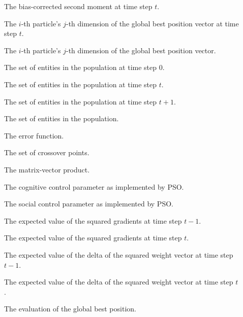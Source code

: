 \begin{description}
	\item [\parbox{2cm}{$\hat{\boldsymbol{v}}_{t}$}] \parbox{12.5cm}{The bias-corrected second moment at time step $t$.}
	\item [\parbox{2cm}{$\hat{y}_{ij}(t)$}] \parbox{12.5cm}{The $i$-th particle's $j$-th dimension of the global best position vector at time step $t$.}
	\item [\parbox{2cm}{$\hat{y}_{ij}$}] \parbox{12.5cm}{The $i$-th particle's $j$-th dimension of the global best position vector.}
	\item [\parbox{2cm}{$\mathcal{C}(0)$}] \parbox{12.5cm}{The set of entities in the population at time step $0$.}
	\item [\parbox{2cm}{$\mathcal{C}(t)$}] \parbox{12.5cm}{The set of entities in the population at time step $t$.}
	\item [\parbox{2cm}{$\mathcal{C}(t+1)$}] \parbox{12.5cm}{The set of entities in the population at time step $t+1$.}
	\item [\parbox{2cm}{$\mathcal{C}$}] \parbox{12.5cm}{The set of entities in the population.}
	\item [\parbox{2cm}{$\mathcal{E}$}] \parbox{12.5cm}{The error function.}
	\item [\parbox{2cm}{$\mathcal{J}$}] \parbox{12.5cm}{The set of crossover points.}
	\item [\parbox{2cm}{$\odot$}] \parbox{12.5cm}{The matrix-vector product.}
	\item [\parbox{2cm}{$c_{1}$}] \parbox{12.5cm}{The cognitive control parameter as implemented by \acs{PSO}.}
	\item [\parbox{2cm}{$c_{2}$}] \parbox{12.5cm}{The social control parameter as implemented by \acs{PSO}.}
	\item [\parbox{2cm}{$E[\boldsymbol{g}^{2}]_{t - 1}$}] \parbox{12.5cm}{The expected value of the squared gradients at time step $t-1$.}
	\item [\parbox{2cm}{$E[\boldsymbol{g}^{2}]_{t}$}] \parbox{12.5cm}{The expected value of the squared gradients at time step $t$.}
	\item [\parbox{2cm}{$E[\Delta \boldsymbol{w}^{2}]_{t - 1}$}] \parbox{12.5cm}{The expected value of the delta of the squared weight vector at time step $t-1$.}
	\item [\parbox{2cm}{$E[\Delta \boldsymbol{w}^{2}]_{t}$}] \parbox{12.5cm}{The expected value of the delta of the squared weight vector at time step $t$.}
	\item [\parbox{2cm}{$f(\boldsymbol{\hat{y}})$}] \parbox{12.5cm}{The evaluation of the global best position.}

\end{description}

